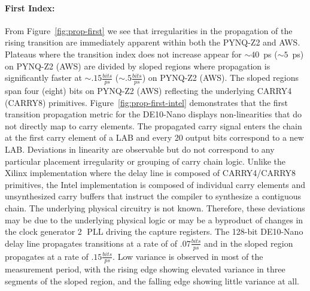 
\paragraph{First Index: }
\label{first_transition}
From Figure~\ref{fig:prop-first} we see that irregularities in the propagation of the rising transition are immediately apparent within both the PYNQ-Z2 and AWS. Plateaus where the transition index does not increase appear for ${\sim}40$~ps (${\sim}5$~ps) on PYNQ-Z2 (AWS) are divided by sloped regions where propagation is significantly faster at ${\sim}.15\frac{bits}{ps}$ (${\sim}.5\frac{bits}{ps}$) on PYNQ-Z2 (AWS). The sloped regions span four (eight) bits on PYNQ-Z2 (AWS) reflecting the underlying CARRY4 (CARRY8) primitives. Figure~\ref{fig:prop-first-intel} demonstrates that the first transition propagation metric for the DE10-Nano displays non-linearities that do not directly map to carry elements. The propagated carry signal enters the chain at the first carry element of a LAB and every 20 output bits correspond to a new LAB. Deviations in linearity are observable but do not correspond to any particular placement irregularity or grouping of carry chain logic. Unlike the Xilinx implementation where the delay line is composed of CARRY4/CARRY8 primitives, the Intel implementation is composed of individual carry elements and unsynthesized carry buffers that instruct the compiler to synthesize a contiguous chain. The underlying physical circuitry is not known. Therefore, these deviations may be due to the underlying physical logic or may be a byproduct of changes in the clock generator \textcircled{2} PLL driving the capture registers. The 128-bit DE10-Nano delay line propagates transitions at a rate of of $.07\frac{bits}{ps}$ and in the sloped region propagates at a rate of $.15\frac{bits}{ps}$. Low variance is observed in most of the measurement period, with the rising edge showing elevated variance in three segments of the sloped region, and the falling edge showing little variance at all.

